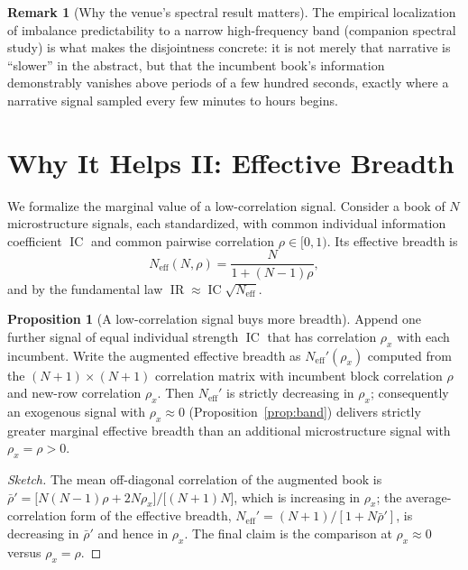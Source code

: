 \documentclass[11pt,a4paper]{article}
\theoremstyle{definition}
\newtheorem{remark}{Remark}[section]
\newtheorem{proposition}{Proposition}[section]
\theoremstyle{plain}
\DeclareMathOperator{\IC}{IC}
\DeclareMathOperator{\IR}{IR}
\begin{document}
\begin{remark}[Why the venue's spectral result matters]
\label{rem:spannung}
The empirical localization of imbalance predictability to a narrow high-frequency band (companion
spectral study) is what makes the disjointness concrete: it is not merely that narrative is ``slower''
in the abstract, but that the incumbent book's information demonstrably vanishes above periods of a
few hundred seconds, exactly where a narrative signal sampled every few minutes to hours begins.
\end{remark}

\section{Why It Helps II: Effective Breadth}
\label{sec:breadth}

We formalize the marginal value of a low-correlation signal. Consider a book of $N$ microstructure
signals, each standardized, with common individual information coefficient $\IC$ and common pairwise
correlation $\rho\in[0,1)$. Its effective breadth is
\begin{equation}
  N_{\mathrm{eff}}(N,\rho) = \frac{N}{1+(N-1)\rho},
  \label{eq:neff}
\end{equation}
and by the fundamental law $\IR\approx \IC\sqrt{N_{\mathrm{eff}}}$.

\begin{proposition}[A low-correlation signal buys more breadth]
\label{prop:marginal}
Append one further signal of equal individual strength $\IC$ that has correlation $\rho_x$ with each
incumbent. Write the augmented effective breadth as $N_{\mathrm{eff}}'(\rho_x)$ computed from the
$(N{+}1)\times(N{+}1)$ correlation matrix with incumbent block correlation $\rho$ and new-row
correlation $\rho_x$. Then $N_{\mathrm{eff}}'$ is strictly decreasing in $\rho_x$; consequently an
exogenous signal with $\rho_x\approx 0$ (Proposition~\ref{prop:band}) delivers strictly greater
marginal effective breadth than an additional microstructure signal with $\rho_x=\rho>0$.
\end{proposition}

\begin{proof}[Sketch]
The mean off-diagonal correlation of the augmented book is
$\bar\rho' = \big[N(N-1)\rho + 2N\rho_x\big]/\big[(N+1)N\big]$, which is increasing in $\rho_x$; the
average-correlation form of the effective breadth,
$N_{\mathrm{eff}}'=(N+1)/[1+N\bar\rho']$, is decreasing in $\bar\rho'$ and hence in $\rho_x$. The
final claim is the comparison at $\rho_x\approx 0$ versus $\rho_x=\rho$.
\end{proof}
\end{document}
